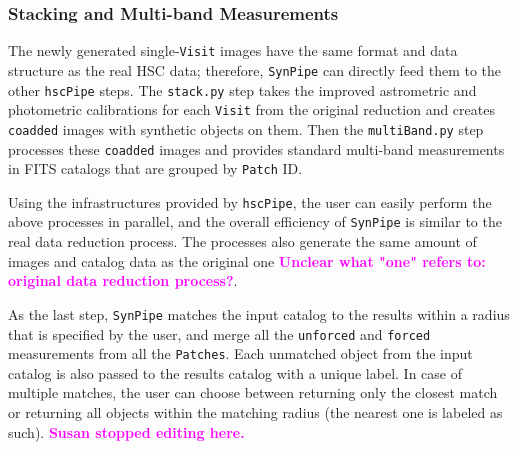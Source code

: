 \documentclass[useamsfonts]{pasj01}
\def\hscpipe{\texttt{hscPipe}}
\def\synpipe{\texttt{SynPipe}}
\def\forced{\texttt{forced}}
\def\unforced{\texttt{unforced}}
\def\visit{\texttt{Visit}}
\newcommand{\susan}[1]{\textcolor{magenta} {\textbf{#1}}}
\begin{document}
\subsubsection{Stacking and Multi-band Measurements}
    \label{sssec:multiband}

    The newly generated single-\visit{} images have the same format and data
    structure as the real HSC data; therefore, \synpipe{} can directly feed them
    to the other \hscpipe{} steps.
    The \texttt{stack.py} step takes the improved astrometric and photometric
    calibrations for each \visit{} from the original reduction and creates
    \texttt{coadded} images with synthetic objects on them.
    Then the \texttt{multiBand.py} step processes these \texttt{coadded} images and
    provides standard multi-band measurements in FITS catalogs that are grouped by
    \texttt{Patch} ID.

    Using the infrastructures provided by \hscpipe{}, the user can easily perform the above processes in parallel, and the overall efficiency of \synpipe{} is similar to the
    real data reduction process.
    The processes also generate the same amount of images and catalog data as the original
    one \susan{Unclear what "one" refers to: original data reduction process?}.

    As the last step, \synpipe{} matches the input catalog to the results within a
    radius that is specified by the user, and merge all the \unforced{} and
    \forced{} measurements from all the \texttt{Patches}.
    Each unmatched object from the input catalog is also passed to the results catalog with a unique label.
    In case of multiple matches, the user can choose between returning only the closest match or returning all objects within the matching radius (the nearest one is
    labeled as such).
    \susan{Susan stopped editing here.}
\end{document}
